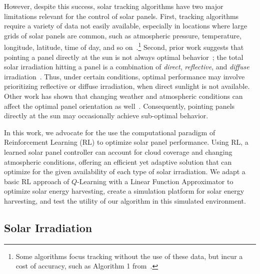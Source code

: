 \documentclass[11pt]{article}
\begin{document}
However, despite this success, solar tracking algorithms have two major limitations relevant for the control of solar panels. First, tracking algorithms require a variety of data not easily available, especially in locations where large grids of solar panels are common, such as atmospheric pressure, temperature, longitude, latitude, time of day, and so on~\cite{Grena2012}.\footnote{Some algorithms focus tracking without the use of these data, but incur a cost of accuracy, such as Algorithm 1 from~\citet{Grena2012}.} Second, prior work suggests that pointing a panel directly at the sun is not always optimal behavior~\citet{Kelly2009,Hussein1995,King2001}; the total solar irradiation hitting a panel is a combination of {\it direct}, {\it reflective}, and {\it diffuse} irradiation~\cite{Benghanem2011}. Thus, under certain conditions, optimal performance may involve prioritizing reflective or diffuse irradiation, when direct sunlight is not available. Other work has shown that changing weather and atmospheric conditions can affect the optimal panel orientation as well~\cite{Kelly2009,Hussein1995}. Consequently, pointing panels directly at the sun may  occasionally achieve sub-optimal behavior.

In this work, we advocate for the use the computational paradigm of Reinforcement Learning (RL) to optimize solar panel performance. Using RL, a learned solar panel controller can account for cloud coverage and changing atmospheric conditions, offering an efficient yet adaptive solution that can optimize for the given availability of each type of solar irradiation. We adapt a basic RL approach of $Q$-Learning with a Linear Function Approximator to optimize solar energy harvesting, create a simulation platform for solar energy harvesting, and test the utility of our algorithm in this simulated environment.


\subsection{Solar Irradiation}
\end{document}
